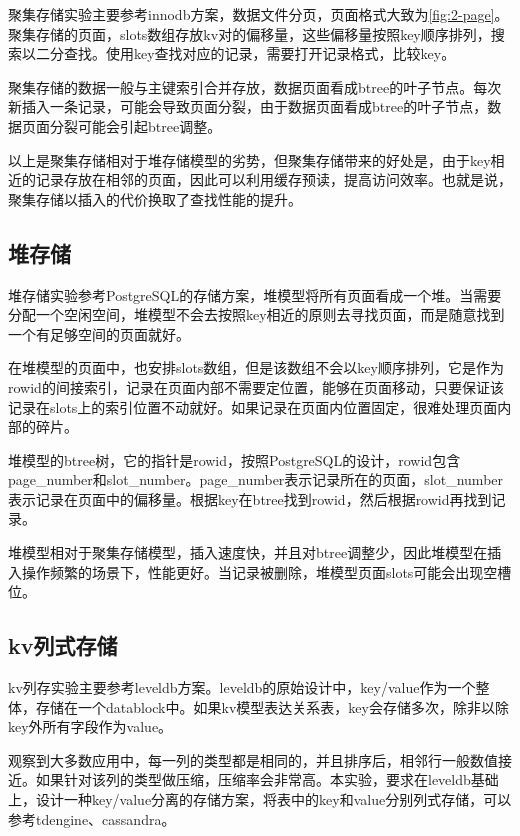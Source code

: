 聚集存储实验主要参考innodb方案，数据文件分页，页面格式大致为\figurename\ref{fig:2-page}。聚集存储的页面，slots数组存放kv对的偏移量，这些偏移量按照key顺序排列，搜索以二分查找。使用key查找对应的记录，需要打开记录格式，比较key。

聚集存储的数据一般与主键索引合并存放，数据页面看成btree的叶子节点。每次新插入一条记录，可能会导致页面分裂，由于数据页面看成btree的叶子节点，数据页面分裂可能会引起btree调整。

以上是聚集存储相对于堆存储模型的劣势，但聚集存储带来的好处是，由于key相近的记录存放在相邻的页面，因此可以利用缓存预读，提高访问效率。也就是说，聚集存储以插入的代价换取了查找性能的提升。

\subsection{堆存储}

堆存储实验参考PostgreSQL的存储方案，堆模型将所有页面看成一个堆。当需要分配一个空闲空间，堆模型不会去按照key相近的原则去寻找页面，而是随意找到一个有足够空间的页面就好。

在堆模型的页面中，也安排slots数组，但是该数组不会以key顺序排列，它是作为rowid的间接索引，记录在页面内部不需要定位置，能够在页面移动，只要保证该记录在slots上的索引位置不动就好。如果记录在页面内位置固定，很难处理页面内部的碎片。

堆模型的btree树，它的指针是rowid，按照PostgreSQL的设计，rowid包含page\_number和slot\_number。page\_number表示记录所在的页面，slot\_number表示记录在页面中的偏移量。根据key在btree找到rowid，然后根据rowid再找到记录。

堆模型相对于聚集存储模型，插入速度快，并且对btree调整少，因此堆模型在插入操作频繁的场景下，性能更好。当记录被删除，堆模型页面slots可能会出现空槽位。

\subsection{kv列式存储}

kv列存实验主要参考leveldb方案。leveldb的原始设计中，key/value作为一个整体，存储在一个datablock中。如果kv模型表达关系表，key会存储多次，除非以除key外所有字段作为value。

观察到大多数应用中，每一列的类型都是相同的，并且排序后，相邻行一般数值接近。如果针对该列的类型做压缩，压缩率会非常高。本实验，要求在leveldb基础上，设计一种key/value分离的存储方案，将表中的key和value分别列式存储，可以参考tdengine、cassandra。


